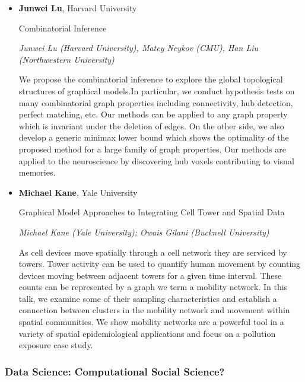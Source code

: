 \begin{itemize}
\item \textbf{Junwei Lu}, Harvard University

Combinatorial Inference

\emph{\footnotesize Junwei Lu (Harvard University), Matey Neykov (CMU), Han Liu (Northwestern University)}

We propose the combinatorial inference to explore the global topological structures of graphical models.In particular, we conduct hypothesis tests on many combinatorial graph properties including connectivity, hub detection, perfect matching, etc. Our methods can be applied to any graph property which is invariant under the deletion of edges. On the other side, we also develop a generic minimax lower bound which shows the optimality of the proposed method for a large family of graph properties. Our methods are applied to the neuroscience by discovering hub voxels contributing to visual memories.

\item \textbf{Michael Kane}, Yale University

Graphical Model Approaches to Integrating Cell Tower and Spatial Data

\emph{\footnotesize Michael Kane (Yale University); Owais Gilani (Bucknell University)}

As cell devices move spatially through a cell network they are serviced by towers. Tower activity can be used to quantify human movement by counting devices moving between adjacent towers for a given time interval. These counts can be represented by a graph we term a mobility network. In this talk, we examine some of their sampling characteristics and establish a connection between clusters in the mobility network and movement within spatial communities. We show mobility networks are a powerful tool in a variety of spatial epidemiological applications and focus on a pollution exposure case study.

\end{itemize}

\subsubsection*{Data Science: Computational Social Science?}

